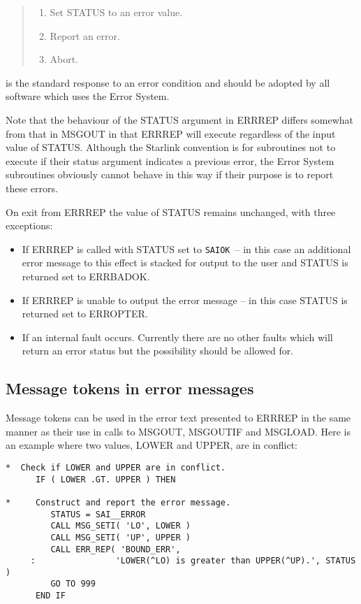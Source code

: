 \documentclass[twoside,11pt]{article}
\newcommand{\xlabel}[1]{}
\renewcommand{\_}{\texttt{\symbol{95}}}
\newcommand{\const}[1]{\texttt{#1}}
\newcommand{\saiok}{\const{SAI\_\_OK}}
\begin{document}
\begin {quote}
\begin {enumerate}
\item Set STATUS to an error value.
\item Report an error.
\item Abort.
\end {enumerate}
\end {quote}

is the standard response to an error condition and should be adopted by all
software which uses the Error System.

Note that the behaviour of the STATUS argument in ERR\_REP differs somewhat
from that in MSG\_OUT in that ERR\_REP will execute regardless of the input
value of STATUS.
Although the Starlink convention is for subroutines not to execute if their
status argument indicates a previous error, the Error System subroutines
obviously cannot behave in this way if their purpose is to report these
errors.

On exit from ERR\_REP the value of STATUS remains unchanged, with three
exceptions:

\begin{itemize}
\item If ERR\_REP is called with STATUS set to \saiok\ -- in this case an
additional error message
to this effect is stacked for output to the user and STATUS is returned set
to ERR\_\_BADOK.
\item If ERR\_REP is unable to output the error message -- in this case
STATUS is returned set to ERR\_\_OPTER.
\item If an internal fault occurs. Currently there are no other faults
which will return an error status but the possibility should be allowed for.
\end{itemize}


\subsection{\xlabel{message_tokens_in_error_messages}Message tokens in error messages \label{etok_sect}}

Message tokens can be used in the error text presented to ERR\_REP
in the same manner as their use in calls to MSG\_OUT, MSG\_OUTIF and
MSG\_LOAD.
Here is an example where two values, LOWER and UPPER, are in conflict:

\begin {small}
\begin{verbatim}
*  Check if LOWER and UPPER are in conflict.
      IF ( LOWER .GT. UPPER ) THEN

*     Construct and report the error message.
         STATUS = SAI__ERROR
         CALL MSG_SETI( 'LO', LOWER )
         CALL MSG_SETI( 'UP', UPPER )
         CALL ERR_REP( 'BOUND_ERR',
     :                'LOWER(^LO) is greater than UPPER(^UP).', STATUS )
         GO TO 999
      END IF
\end{verbatim}
\end {small}
\end{document}
